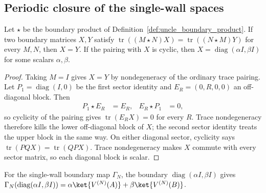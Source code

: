 \subsection{Periodic closure of the single-wall spaces}

\begin{lemma}
    \label{thm:uncle_cyclic_boundary_coefficients}
    \leanok
    Let $\star$ be the boundary product of
    Definition~\ref{def:uncle_boundary_product}.
    If two boundary matrices $X,Y$ satisfy
    $\operatorname{tr}((M\star N)X)=\operatorname{tr}((N\star M)Y)$
    for every $M,N$, then $X=Y$. If the pairing with $X$ is cyclic,
    then $X=\operatorname{diag}(\alpha I,\beta I)$ for some scalars
    $\alpha,\beta$.
\end{lemma}

\begin{proof}
    \leanok
    Taking $M=I$ gives $X=Y$ by nondegeneracy of the ordinary trace
    pairing. Let $P_1=\operatorname{diag}(I,0)$ be the first sector
    identity and $E_R=(0,R,0,0)$ an off-diagonal block. Then
    \begin{align}
        P_1\star E_R & =E_R, & E_R\star P_1 & =0,
        \label{eq:uncle_cyclic_offdiagonal_products}
    \end{align}
    so cyclicity of the pairing gives $\operatorname{tr}(E_RX)=0$ for every
    $R$. Trace nondegeneracy therefore kills the lower off-diagonal block
    of $X$; the second sector identity treats the upper block in the same
    way.
    On either diagonal sector, cyclicity says
    $\operatorname{tr}(PQX)=\operatorname{tr}(QPX)$. Trace
    nondegeneracy makes $X$ commute with every sector matrix, so each
    diagonal block is scalar.
\end{proof}

\begin{lemma}
    \label{thm:uncle_scalar_boundaries}
    \leanok
    For the single-wall boundary map $\Gamma_N$, the boundary
    $\operatorname{diag}(\alpha I,\beta I)$ gives
    $\Gamma_N(\operatorname{diag}(\alpha I,\beta I))
        =\alpha\ket{V^{(N)}(A)}+\beta\ket{V^{(N)}(B)}$.
\end{lemma}

